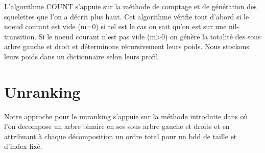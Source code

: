 \documentclass[french]{article}
\begin{document}
L'algorithme COUNT s'appuie sur la méthode de comptage et de génération des squelettes que l'on a décrit plus haut. Cet algorithme vérifie tout d'abord si le noeud courant est vide (m=0) si tel est le cas on sait qu'on est sur une nil-transition. Si le noeud courant n'est pas vide (m>0) on génère la totalité des sous arbre gauche et droit et déterminons récursivement leurs poids. Nous stockons leurs poids dans un dictionnaire selon leurs profil.
\begin{algorithm}
  \begin{algorithmic}[1]
    \Statex
      \State {}
      \State {} 
        \State {}
            \State {}
        \EndIf
      \Else
            \State {}
            \Else
                \EndFor
            \EndIf
                \State {}
                \State {}
                \Else
                        \State {}
                    \EndFor
                \EndIf
                    \State {}
                    \State {}
                    \Else
                    \EndIf\EndFor\EndFor\EndFor\EndIf
      \State {}
    \EndFunction
  \end{algorithmic}
\end{algorithm}

\newpage
\section{Unranking}
Notre approche pour le unranking s'appuie sur la méthode introduite dans \cite{wilf} où l'on decompose un arbre binaire en ses sous arbre gauche et droits et en attribuant à chaque décomposition un ordre total pour un bdd de taille et d'index fixé.
\end{document}
